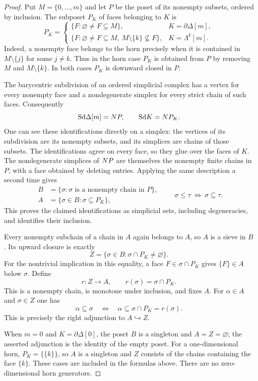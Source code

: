 \begin{proof}
Put $M=\{0,\ldots,m\}$ and let $P$ be the poset of its nonempty
subsets, ordered by inclusion.  The subposet $P_K$ of faces belonging
to $K$ is
\[
 P_K=
 \begin{cases}
  \{F:\varnothing\ne F\subsetneq M\},&K=\partial\Delta[m],\\[2pt]
  \{F:\varnothing\ne F\subseteq M,\ M\setminus\{k\}\nsubseteq F\},
     &K=\Lambda^k[m].
 \end{cases}
\]
Indeed, a nonempty face belongs to the horn precisely when it is
contained in $M\setminus\{j\}$ for some $j\ne k$.  Thus in the horn
case $P_K$ is obtained from $P$ by removing $M$ and
$M\setminus\{k\}$.  In both cases $P_K$ is downward closed in $P$.

The barycentric subdivision of an ordered simplicial complex has a
vertex for every nonempty face and a nondegenerate simplex for every
strict chain of such faces.  Consequently
\[
 \mathrm{Sd}\Delta[m]=N P,\qquad \mathrm{Sd} K=N P_K.
\]
One can see these identifications directly on a simplex: the vertices
of its subdivision are its nonempty subsets, and its simplices are
chains of those subsets.  The identifications agree on every face, so
they glue over the faces of $K$.  The nondegenerate simplices of
$N P$ are themselves the nonempty finite chains in $P$, with a
face obtained by deleting entries.  Applying the same description a
second time gives
\[
 \begin{split}
 B&=\{\sigma:\sigma\text{ is a nonempty chain in }P\},\\
 A&=\{\sigma\in B:\sigma\subseteq P_K\},
 \end{split}
 \qquad \sigma\leq\tau\ \Longleftrightarrow\ \sigma\subseteq\tau.
\]
This proves the claimed identifications as simplicial sets, including
degeneracies, and identifies their inclusion.

Every nonempty subchain of a chain in $A$ again belongs to $A$, so $A$
is a sieve in $B$.  Its upward closure is exactly
\[
 Z=\{\sigma\in B:\sigma\cap P_K\ne\varnothing\}.
\]
For the nontrivial implication in this equality, a face
$F\in\sigma\cap P_K$ gives $\{F\}\in A$ below $\sigma$.
Define
\[
 r:Z\longrightarrow A,\qquad r(\sigma)=\sigma\cap P_K.
\]
This is a nonempty chain, is monotone under inclusion, and fixes $A$.
For $\alpha\in A$ and $\sigma\in Z$ one has
\[
 \alpha\subseteq\sigma
 \quad\Longleftrightarrow\quad
 \alpha\subseteq\sigma\cap P_K=r(\sigma).
\]
This is precisely the right adjunction to $A\hookrightarrow Z$.

When $m=0$ and $K=\partial\Delta[0]$, the poset $B$ is a singleton
and $A=Z=\varnothing$; the asserted adjunction is the identity of the
empty poset.  For a one-dimensional horn, $P_K=\{\{k\}\}$, so $A$
is a singleton and $Z$ consists of the chains containing the face
$\{k\}$.  These cases are included in the formulas above.  There are
no zero-dimensional horn generators.
\end{proof}

